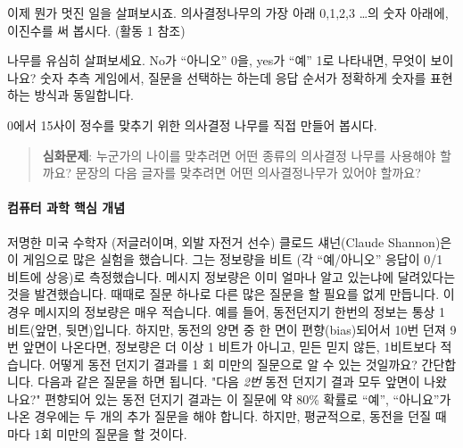 \documentclass[]{article}
\begin{document}
이제 뭔가 멋진 일을 살펴보시죠. 의사결정나무의 가장 아래 0,1,2,3
\ldots{}의 숫자 아래에, 이진수를 써 봅시다. (활동 1 참조)

나무를 유심히 살펴보세요. No가 ``아니오'' 0을, yes가 ``예'' 1로
나타내면, 무엇이 보이나요? 숫자 추측 게임에서, 질문을 선택하는 하는데
응답 순서가 정확하게 숫자를 표현하는 방식과 동일합니다.

0에서 15사이 정수를 맞추기 위한 의사결정 나무를 직접 만들어 봅시다.

\begin{quote}
\textbf{심화문제}: 누군가의 나이를 맞추려면 어떤 종류의 의사결정 나무를
사용해야 할까요? 문장의 다음 글자를 맞추려면 어떤 의사결정나무가 있어야
할까요?
\end{quote}

\mbox{}\paragraph{컴퓨터 과학 핵심 개념}\label{section-84}

저명한 미국 수학자 (저글러이며, 외발 자전거 선수) 클로드 섀넌(Claude
Shannon)은 이 게임으로 많은 실험을 했습니다. 그는 정보량을 비트 (각
``예/아니오'' 응답이 0/1 비트에 상응)로 측정했습니다. 메시지 정보량은
이미 얼마나 알고 있는냐에 달려있다는 것을 발견했습니다. 때때로 질문
하나로 다른 많은 질문을 할 필요를 없게 만듭니다. 이 경우 메시지의
정보량은 매우 적습니다. 예를 들어, 동전던지기 한번의 정보는 통상 1
비트(앞면, 뒷면)입니다. 하지만, 동전의 양면 중 한 면이 편향(bias)되어서
10번 던져 9번 앞면이 나온다면, 정보량은 더 이상 1 비트가 아니고, 믿든
믿지 않든, 1비트보다 적습니다. 어떻게 동전 던지기 결과를 1 회 미만의
질문으로 알 수 있는 것일까요? 간단합니다. 다음과 같은 질문을 하면
됩니다. "다음 \emph{2번} 동전 던지기 결과 모두 앞면이 나왔나요?"
편향되어 있는 동전 던지기 결과는 이 질문에 약 80\% 확률로 ``예'',
``아니요''가 나온 경우에는 두 개의 추가 질문을 해야 합니다. 하지만,
평균적으로, 동전을 던질 때마다 1회 미만의 질문을 할 것이다.
\end{document}
